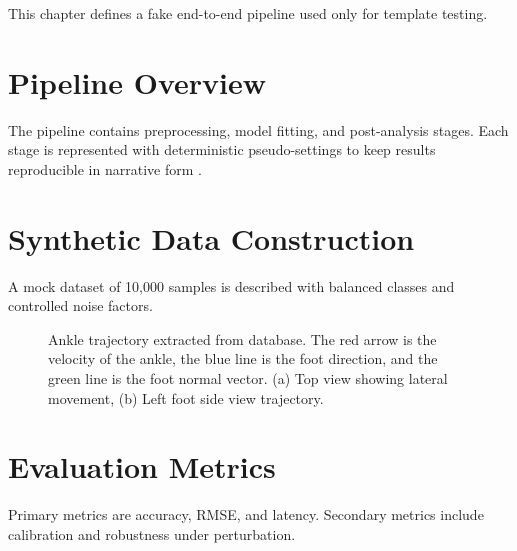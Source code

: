 \label{chap:method}

This chapter defines a fake end-to-end pipeline used only for template testing.

\section{Pipeline Overview}
The pipeline contains preprocessing, model fitting, and post-analysis stages. Each stage is represented with deterministic pseudo-settings to keep results reproducible in narrative form \cite{owens2025survey}.

\section{Synthetic Data Construction}
A mock dataset of 10,000 samples is described with balanced classes and controlled noise factors.


\begin{figure}[htbp]
    \centering
    \begin{subfigure}[b]{0.45\linewidth}
        \centering
        \caption{}
        \label{sub:left_gait_top}
    \end{subfigure}
    \hfill
    \begin{subfigure}[b]{0.9\linewidth}
        \centering
        \caption{}
        \label{sub:left_gait_side}
    \end{subfigure}
    \caption{Ankle trajectory extracted from database. The red arrow is the velocity of the ankle, the blue line is the foot direction, and the green line is the foot normal vector. (a) Top view showing lateral movement, (b) Left foot side view trajectory.}
    \label{fig:gait_model}
\end{figure}

\section{Evaluation Metrics}
Primary metrics are accuracy, RMSE, and latency. Secondary metrics include calibration and robustness under perturbation.
